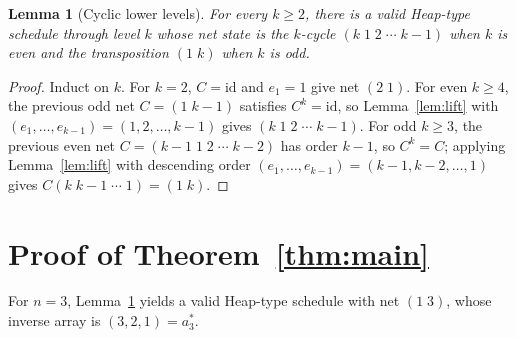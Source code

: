 \documentclass[11pt]{article}
\newtheorem{lemma}[theorem]{Lemma}
\begin{document}
\begin{lemma}[Cyclic lower levels]\label{lem:cyclic}
For every $k \ge 2$, there is a valid Heap-type schedule through level $k$ whose
net state is the $k$-cycle $(k\;1\;2\;\cdots\;k-1)$ when $k$ is even and the
transposition $(1\;k)$ when $k$ is odd.
\end{lemma}

\begin{proof}
Induct on $k$. For $k=2$, $C = \mathrm{id}$ and $e_1 = 1$ give net $(2\;1)$.
For even $k \ge 4$, the previous odd net $C = (1\;k-1)$ satisfies $C^k = \mathrm{id}$,
so Lemma~\ref{lem:lift} with $(e_1,\dots,e_{k-1}) = (1,2,\dots,k-1)$ gives
$(k\;1\;2\;\cdots\;k-1)$. For odd $k \ge 3$, the previous even net
$C = (k-1\;1\;2\;\cdots\;k-2)$ has order $k-1$, so $C^k = C$; applying
Lemma~\ref{lem:lift} with descending order $(e_1,\dots,e_{k-1}) = (k-1,k-2,\dots,1)$
gives $C (k\;k-1\;\cdots\;1) = (1\;k)$.
\end{proof}

\section{Proof of Theorem~\ref{thm:main}}

For $n = 3$, Lemma~\ref{lem:cyclic} yields a valid Heap-type schedule with net
$(1\;3)$, whose inverse array is $(3,2,1) = a^*_3$.
\end{document}
